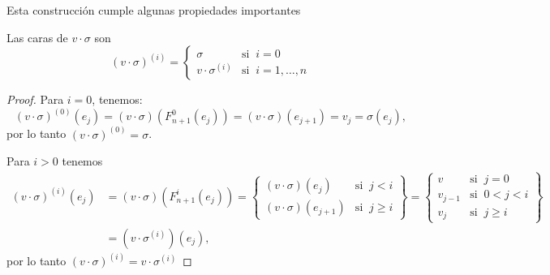\documentclass[../../topologia_algebraica]{subfiles}
\begin{document}
\begin{ejemplo}
\begin{figure}[h!]%
  \centering
\end{figure}%
\end{ejemplo}

Esta construcci\'on cumple algunas propiedades importantes

\begin{lema}\label{lema:uno_invariancia}
  Las caras de $v\cdot\sigma$ son
  \[
    (v\cdot\sigma)^{(i)}=
    \begin{cases}
      \sigma &\text{si}\;\; i=0 \\
      v\cdot\sigma^{(i)} &\text{si}\;\; i=1,\ldots,n
    \end{cases}
  \]
\end{lema}
\begin{proof}
  Para $i=0$, tenemos:
  \[
    (v\cdot\sigma)^{(0)}(e_j)=(v\cdot\sigma)(F^0_{n+1}(e_j))=(v\cdot\sigma)(e_{j+1})=
    v_j=\sigma(e_j),
  \]
  por lo tanto $(v\cdot\sigma)^{(0)}=\sigma$.

  Para $i>0$ tenemos
  \begin{align*}
    (v\cdot\sigma)^{(i)}(e_j)&=(v\cdot\sigma)(F^i_{n+1}(e_j))=
    \left. \begin{cases}
      (v\cdot\sigma)(e_j) &\text{si}\;\; j<i\\
      (v\cdot\sigma)(e_{j+1}) &\text{si}\;\; j\geq i
    \end{cases}\right\}=
  \left. \begin{cases}
      v &\text{si}\;\; j=0 \\
      v_{j-1} &\text{si}\;\; 0<j<i\\
      v_j &\text{si}\;\; j\geq i
    \end{cases}\right\}\\ & =
  (v\cdot\sigma^{(i)})(e_j),
  \end{align*}
por lo tanto $(v\cdot\sigma)^{(i)}=v\cdot\sigma^{(i)}$
\end{proof}
\end{document}
